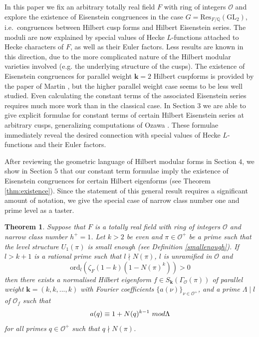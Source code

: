 \documentclass[a4paper,oneside]{amsart}
\theoremstyle{plain}
\newtheorem{thm}{Theorem}[section]
\theoremstyle{definition}
\begin{document}
In this paper we fix an arbitrary totally real field $F$ with ring of integers $\mathcal{O}$ and explore the existence of Eisenstein congruences in the case $G = \text{Res}_{F/\mathbb{Q}}(\text{GL}_2)$, i.e.\ congruences between Hilbert cusp forms and Hilbert Eisenstein series. The moduli are now explained by special values of Hecke $L$-functions attached to Hecke characters of $F$, as well as their Euler factors. Less results are known in this direction, due to the more complicated nature of the Hilbert modular varieties involved (e.g. the underlying structure of the cusps). The existence of Eisenstein congruences for parallel weight $\textbf{k} = 2$ Hilbert cuspforms is provided by the paper of Martin \cite{martin}, but the higher parallel weight case seems to be less well studied. Even calculating the constant terms of the associated Eisenstein series requires much more work than in the classical case. In Section $3$ we are able to give explicit formulae for constant terms of certain Hilbert Eisenstein series at arbitrary cusps, generalizing computations of Ozawa \cite{ozawa}. These formulae immediately reveal the desired connection with special values of Hecke $L$-functions and their Euler factors.

After reviewing the geometric language of Hilbert modular forms in Section $4$, we show in Section $5$ that our constant term formulae imply the existence of Eisenstein congruences for certain Hilbert eigenforms (see Theorem \ref{thm:existence}). Since the statement of this general result requires a significant amount of notation, we give the special case of narrow class number one and prime level as a taster.

\begin{thm}

Suppose that $F$ is a totally real field with ring of integers $\mathcal{O}$ and narrow class number $h^+ = 1$. Let $k>2$ be even and $\pi\in\mathcal{O}^+$ be a prime such that the level structure $U_1(\pi)$ is small enough (see Definition \ref{smallenough}). If $l > k+1$ is a rational prime such that $l\nmid N(\pi)$, $l$ is unramified in $\mathcal{O}$ and
\begin{equation*}
    \text{ord}_{l}(\zeta_F(1-k)(1-N(\pi)^k)) > 0
\end{equation*}
then there exists a normalised Hilbert eigenform $f \in S_{\textbf{k}}(\Gamma_{\mathcal{O}}(\pi))$ of parallel weight $\textbf{k} = (k,k,...,k)$ with Fourier coefficients $\{a(\nu)\}_{\nu\in\mathcal{O}^+}$, and a prime $\Lambda \mid l$ of $\mathcal{O}_f$ such that
\begin{equation*}
    a(q) \equiv 1+N(q)^{k-1} \ \textnormal{mod } \Lambda
\end{equation*} for all primes $q\in\mathcal{O}^+$ such that $q \nmid N(\pi)$.
\end{thm}
\end{document}
